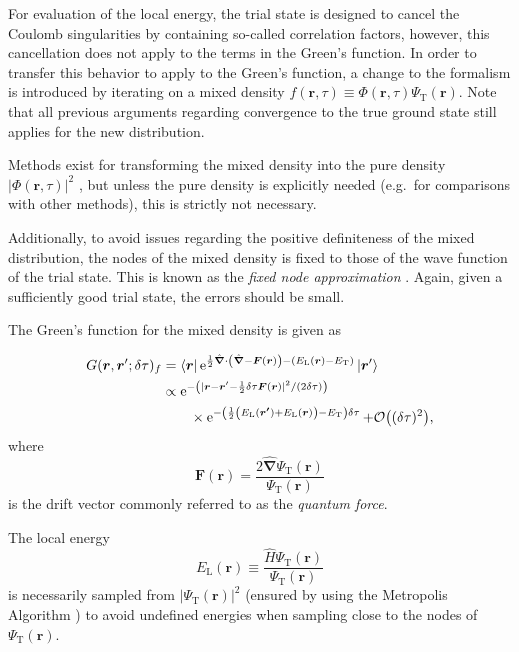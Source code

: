 For evaluation of the local energy, the trial state is designed to cancel the Coulomb singularities by containing so-called correlation factors, however, this cancellation does not apply to the terms in the Green's function. In order to transfer this behavior to apply to the Green's function, a change to the formalism is introduced by iterating on a mixed density $f(\bm{r}, \tau) \equiv \Phi(\bm{r}, \tau)\Psi_{\mathrm{T}}(\bm{r})$. Note that all previous arguments regarding convergence to the true ground state still applies for the new distribution.

Methods exist for transforming the mixed density into the pure density $|\Phi(\bm{r}, \tau)|^2$ \cite{abInitioMC}, but unless the pure density is explicitly needed (e.g.\ for comparisons with other methods), this is strictly not necessary.

Additionally, to avoid issues regarding the positive definiteness of the mixed distribution, the nodes of the mixed density is fixed to those of the wave function of the trial state. This is known as the \textit{fixed node approximation} \cite{umrigar:2865, abInitioMC}. Again, given a sufficiently good trial state, the errors should be small.

The Green's function for the mixed density is given as \cite{umrigar:2865}

\begin{align}
  G(\bm{r}, \bm{r}'; \delta\tau)_f &= \langle \bm{r} | \operatorname{e}^{\frac{1}{2} \hat{\bm{\nabla}} \cdot \left(\hat{\bm{\nabla}} - \bm{F}(\bm{r})\right) - \left(E_{\mathrm{L}}(\bm{r}) - E_{\mathrm{T}}\right)} | \bm{r}' \rangle \label{eq:DMC_IS_GF_raw}\\
  &\propto \operatorname{e}^{-\left(|\bm{r} - \bm{r}' - \frac{1}{2}\delta\tau\bm{F}(\bm{r})|^2/(2\delta\tau)\right)} \label{eq:DMC_IS_GF}\\
  &\qquad\times \operatorname{e}^{-\left(\frac{1}{2}\left(E_{\mathrm{L}}(\bm{r'}) + E_{\mathrm{L}}(\bm{r})\right) - E_{\mathrm{T}}\right) \delta\tau} + \mathcal{O}\bigl((\delta\tau)^2\bigr), \notag
\end{align}
where
\begin{equation}
  \bm{F}(\bm{r}) = \frac{2 \hat{\bm{\nabla}} \Psi_{\mathrm{T}}(\bm{r})}{\Psi_{\mathrm{T}}(\bm{r})}
\end{equation}
is the drift vector commonly referred to as the \textit{quantum force}.

The local energy
\begin{equation}
E_{\mathrm{L}}(\bm{r}) \equiv \frac{\hat{H} \Psi_{\mathrm{T}}(\bm{r})}{\Psi_{\mathrm{T}}(\bm{r})}
\end{equation}
is necessarily sampled from $|\Psi_{\mathrm{T}}(\bm{r})|^2$ (ensured by using the Metropolis Algorithm \cite{abInitioMC}) to avoid undefined energies when sampling close to the nodes of $\Psi_{\mathrm{T}}(\bm{r})$.

